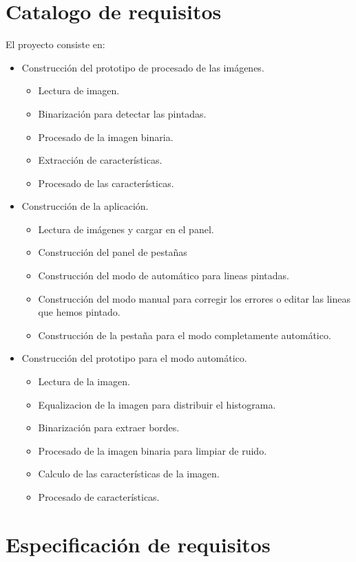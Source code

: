\section{Catalogo de requisitos}
El proyecto consiste en:
\begin{itemize}
	\item Construcción del prototipo de procesado de las imágenes.
		\begin{itemize}
			\item Lectura de imagen.
			\item Binarización para detectar las pintadas.
			\item Procesado de la imagen binaria.
			\item Extracción de características.
			\item Procesado de las características.
		\end{itemize}
	\item Construcción de la aplicación.
		\begin{itemize}
			\item Lectura de imágenes y cargar en el panel.
			\item Construcción del panel de pestañas
			\item Construcción del modo de automático para lineas pintadas.
			\item Construcción del modo manual para corregir los errores o editar las lineas que hemos pintado.
			\item Construcción de la pestaña para el modo completamente automático.			
		\end{itemize}
	\item Construcción del prototipo para el modo automático.
		\begin{itemize}
			\item Lectura de la imagen.
			\item Equalizacion de la imagen para distribuir el histograma.
			\item Binarización para extraer bordes.
			\item Procesado de la imagen binaria para limpiar de ruido.
			\item Calculo de las características de la imagen.
			\item Procesado de características.		
		\end{itemize}
\end{itemize}


\section{Especificación de requisitos}

